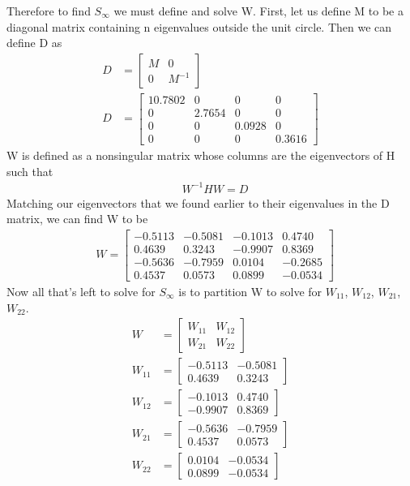 \documentclass{article}
\begin{document}
  Therefore to find $S_{\infty}$ we must define and solve W. \newline
  First, let us define M to be a diagonal matrix containing n eigenvalues outside the unit circle. Then we can define D as
  \begin{align*}
	  D&=
	  \begin{bmatrix}
		  M & 0 \\
		  0 & M^{-1}
	  \end{bmatrix} \\
	  D&=
	  \begin{bmatrix}
		  10.7802 & 0 & 0 & 0 \\
		  0 & 2.7654 & 0 & 0 \\
		  0 & 0 & 0.0928 & 0 \\
		  0 & 0 & 0 & 0.3616
	  \end{bmatrix}
  \end{align*}
  W is defined as a nonsingular matrix whose columns are the eigenvectors of H such that
  \begin{align*}
	  &W^{-1}HW=D
  \end{align*}
  Matching our eigenvectors that we found earlier to their eigenvalues in the D matrix, we can find W to be
  \begin{align*}
	  &W=
	  \begin{bmatrix}
		  -0.5113 & -0.5081 & -0.1013 &  0.4740 \\
                   0.4639 &  0.3243 & -0.9907 &  0.8369 \\
                  -0.5636 & -0.7959 &  0.0104 & -0.2685 \\
                   0.4537 &  0.0573 &  0.0899 & -0.0534
	  \end{bmatrix}
  \end{align*}
  Now all that's left to solve for $S_{\infty}$ is to partition W to solve for $W_{11}$, $W_{12}$, $W_{21}$, $W_{22}$.
  \begin{align*}
	  W&=
	  \begin{bmatrix}
		  W_{11} & W_{12} \\
		  W_{21} & W_{22}
	  \end{bmatrix} \\
	  W_{11}&=
	  \begin{bmatrix}
		  -0.5113 & -0.5081 \\
		  0.4639 & 0.3243
	  \end{bmatrix} \\
	  W_{12}&=
	  \begin{bmatrix}
		  -0.1013 & 0.4740 \\
		  -0.9907 & 0.8369
	  \end{bmatrix} \\
	  W_{21}&=\begin{bmatrix}
		  -0.5636 & -0.7959 \\
		  0.4537 & 0.0573
	  \end{bmatrix} \\
	  W_{22}&=\begin{bmatrix}
		  0.0104 & -0.0534 \\
		  0.0899 & -0.0534
	  \end{bmatrix}
  \end{align*}
\end{document}
